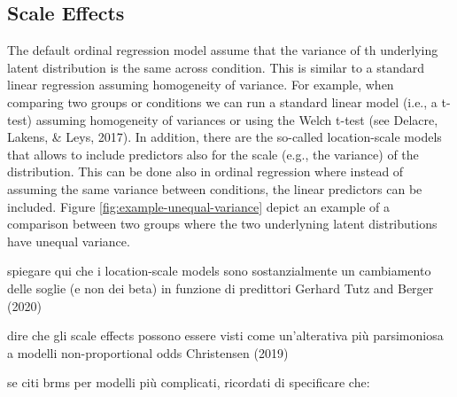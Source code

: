 \documentclass[
  man,floatsintext]{apa6}
\newenvironment{Shaded}{\begin{snugshade}}{\end{snugshade}}
\newcommand{\CommentTok}[1]{\textcolor[rgb]{0.56,0.35,0.01}{\textit{#1}}}
\newcommand{\DecValTok}[1]{\textcolor[rgb]{0.00,0.00,0.81}{#1}}
\newcommand{\FunctionTok}[1]{\textcolor[rgb]{0.13,0.29,0.53}{\textbf{#1}}}
\newcommand{\NormalTok}[1]{#1}
\newcommand{\OtherTok}[1]{\textcolor[rgb]{0.56,0.35,0.01}{#1}}
\newcommand{\SpecialCharTok}[1]{\textcolor[rgb]{0.81,0.36,0.00}{\textbf{#1}}}
\begin{document}
\begin{Shaded}
\end{Shaded}

\subsection{Scale Effects}\label{scale-effects}

The default ordinal regression model assume that the variance of th underlying latent distribution is the same across condition. This is similar to a standard linear regression assuming homogeneity of variance. For example, when comparing two groups or conditions we can run a standard linear model (i.e., a t-test) assuming homogeneity of variances or using the Welch t-test (see Delacre, Lakens, \& Leys, 2017). In addition, there are the so-called location-scale models that allows to include predictors also for the scale (e.g., the variance) of the distribution. This can be done also in ordinal regression where instead of assuming the same variance between conditions, the linear predictors can be included. Figure \ref{fig:example-unequal-variance} depict an example of a comparison between two groups where the two underlyning latent distributions have unequal variance.

spiegare qui che i location-scale models sono sostanzialmente un cambiamento delle soglie (e non dei beta) in funzione di predittori Gerhard Tutz and Berger (2020)

dire che gli scale effects possono essere visti come un'alterativa più parsimoniosa a modelli non-proportional odds Christensen (2019)

se citi brms per modelli più complicati, ricordati di specificare che:
\end{document}

